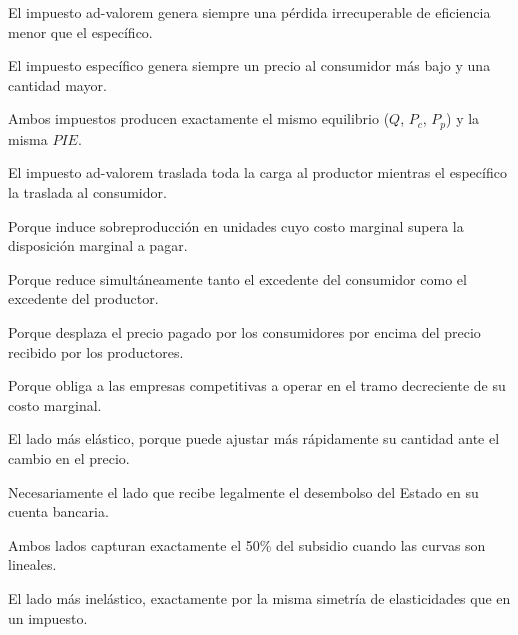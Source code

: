 \begin{opts}
    \item El impuesto ad-valorem genera siempre una pérdida irrecuperable de eficiencia menor que el específico.
    \item El impuesto específico genera siempre un precio al consumidor más bajo y una cantidad mayor.
    \item Ambos impuestos producen exactamente el mismo equilibrio ($Q$, $P_c$, $P_p$) y la misma $PIE$.
    \item El impuesto ad-valorem traslada toda la carga al productor mientras el específico la traslada al consumidor.
\end{opts}

\begin{opts}
    \item Porque induce sobreproducción en unidades cuyo costo marginal supera la disposición marginal a pagar.
    \item Porque reduce simultáneamente tanto el excedente del consumidor como el excedente del productor.
    \item Porque desplaza el precio pagado por los consumidores por encima del precio recibido por los productores.
    \item Porque obliga a las empresas competitivas a operar en el tramo decreciente de su costo marginal.
\end{opts}

\begin{opts}
    \item El lado más elástico, porque puede ajustar más rápidamente su cantidad ante el cambio en el precio.
    \item Necesariamente el lado que recibe legalmente el desembolso del Estado en su cuenta bancaria.
    \item Ambos lados capturan exactamente el 50\% del subsidio cuando las curvas son lineales.
    \item El lado más inelástico, exactamente por la misma simetría de elasticidades que en un impuesto.
\end{opts}

